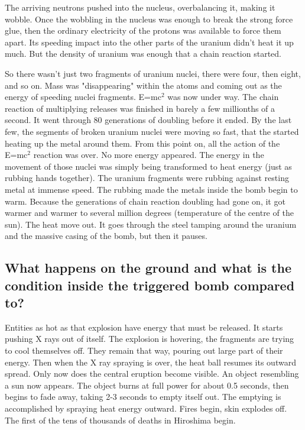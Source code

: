 The arriving neutrons pushed into the nucleus, overbalancing it, making it wobble. Once the wobbling in the nucleus was enough to break the strong force glue, then the ordinary electricity of the protons was available to force them apart. Its speeding impact into the other parts of the uranium didn't heat it up much. But the density of uranium was enough that a chain reaction started.

So there wasn't just two fragments of uranium nuclei, there were four, then eight, and so on. Mass was "disappearing" within the atoms and coming out as the energy of speeding nuclei fragments. E=mc$^2$ was now under way. The chain reaction of multiplying releases was finished in barely a few millionths of a second. It went through 80 generations of doubling before it ended. By the last few, the segments of broken uranium nuclei were moving so fast, that the started heating up the metal around them. From this point on, all the action of the E=mc$^2$ reaction was over. No more energy appeared. The energy in the movement of those nuclei was simply being transformed to heat energy (just as rubbing hands together). The uranium fragments were rubbing against resting metal at immense speed. The rubbing made the metals inside the bomb begin to warm. Because the generations of chain reaction doubling had gone on, it got warmer and warmer to several million degrees (temperature of the centre of the sun). The heat move out. It goes through the steel tamping around the uranium and the massive casing of the bomb, but then it pauses.

\subsection*{What happens on the ground and what is the condition inside the triggered bomb compared to?}
Entities as hot as that explosion have energy that must be released. It starts pushing X rays out of itself. The explosion is hovering, the fragments are trying to cool themselves off. They remain that way, pouring out large part of their energy. Then when the X ray spraying is over, the heat ball resumes its outward spread. Only now does the central eruption become visible. An object resembling a sun now appears. The object burns at full power for about 0.5 seconds, then begins to fade away, taking 2-3 seconds to empty itself out. The emptying is accomplished by spraying heat energy outward. Fires begin, skin explodes off. The first of the tens of thousands of deaths in Hiroshima begin. 

